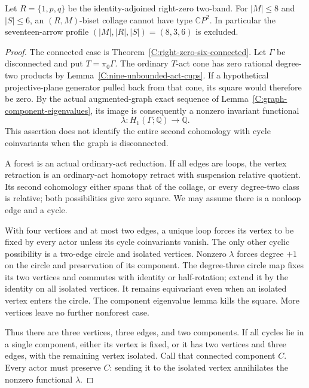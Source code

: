 \begin{theorem}
\label{C:right-zero-six-small-sources}
Let $R=\{1,p,q\}$ be the identity-adjoined right-zero two-band.
For $|M|\leq8$ and $|S|\leq6$, an $(R,M)$-biset collage cannot
have type $\mathbb CP^2$.  In particular the seventeen-arrow
profile $(|M|,|R|,|S|)=(8,3,6)$ is excluded.
\end{theorem}
\begin{proof}
The connected case is Theorem~\ref{C:right-zero-six-connected}.
Let $\Gamma$ be disconnected and put $T=\pi_0\Gamma$.
The ordinary $T$-act cone has zero rational degree-two products
by Lemma~\ref{C:nine-unbounded-act-cups}.  If a hypothetical
projective-plane generator pulled back from that cone, its square
would therefore be zero.  By the actual augmented-graph exact
sequence of Lemma~\ref{C:graph-component-eigenvalues}, its image
is consequently a nonzero invariant functional
\[
 \lambda:H_1(\Gamma;\mathbb Q)\longrightarrow\mathbb Q.
\]
This assertion does not identify the entire second cohomology
with cycle coinvariants when the graph is disconnected.

A forest is an actual ordinary-act reduction.  If all edges are
loops, the vertex retraction is an ordinary-act homotopy retract
with suspension relative quotient.  Its second cohomology either
spans that of the collage, or every degree-two class is relative;
both possibilities give zero square.  We may assume there is a
nonloop edge and a cycle.

With four vertices and at most two edges, a unique loop forces
its vertex to be fixed by every actor unless its cycle
coinvariants vanish.  The only other cyclic possibility is a
two-edge circle and isolated vertices.  Nonzero $\lambda$ forces
degree $+1$ on the circle and preservation of its component.
The degree-three circle map fixes its two vertices and commutes
with identity or half-rotation; extend it by the identity on all
isolated vertices.  It remains equivariant even when an isolated
vertex enters the circle.  The component eigenvalue lemma kills
the square.  More vertices leave no further nonforest case.

Thus there are three vertices, three edges, and two components.
If all cycles lie in a single component, either its vertex is
fixed, or it has two vertices and three edges, with the remaining
vertex isolated.  Call that connected component $C$.  Every actor
must preserve $C$: sending it to the isolated vertex annihilates
the nonzero functional $\lambda$.


\end{proof}
